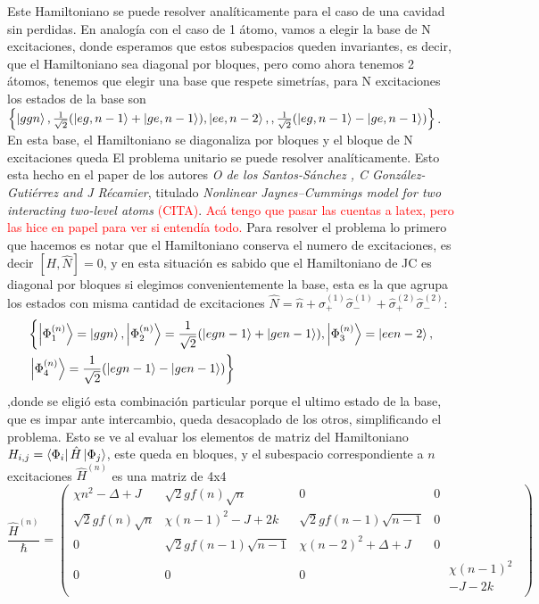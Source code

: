 Este Hamiltoniano se puede resolver analíticamente para el caso de una cavidad sin perdidas. En analogía con el caso de 1 átomo, vamos a elegir la base de N excitaciones, donde esperamos que estos subespacios queden invariantes, es decir, que el Hamiltoniano sea diagonal por bloques, pero como ahora tenemos 2 átomos, tenemos que elegir una base que respete simetrías, para N excitaciones los estados de la base son $\left\{\ket{ggn},\frac{1}{\sqrt{2}}(\ket{eg,n-1}+\ket{ge,n-1}),\ket{ee,n-2},,\frac{1}{\sqrt{2}}(\ket{eg,n-1}-\ket{ge,n-1})\right\}$. En esta base, el Hamiltoniano se diagonaliza por bloques y el bloque de N excitaciones queda
El problema unitario se puede resolver analíticamente. Esto esta hecho en el paper de los autores \textit{O de los Santos-Sánchez
, C González-Gutiérrez and J Récamier}, titulado \textit{Nonlinear Jaynes–Cummings model for two
interacting two-level atoms} \cite{paper:santos}\textcolor{red}{(CITA)}. 
\textcolor{red}{Ac\'a tengo que pasar las cuentas a latex, pero las hice en papel para ver si entend\'ia todo.}
Para resolver el problema lo primero que hacemos es notar que el Hamiltoniano conserva el numero de excitaciones, es decir $[H,\hat N]=0$, y en esta situación es sabido que el Hamiltoniano de JC es diagonal por bloques si elegimos convenientemente la base, esta es la que agrupa los estados con misma cantidad de excitaciones $\hat N = \hat n + \hat \sigma_+^{(1)}\hat \sigma_-^{(1)}+\hat \sigma_+^{(2)}\hat \sigma_-^{(2)}$: 
\begin{equation}
\begin{split}
    & \left\{\ket{\Phi^{(n)}_1}=\ket{ggn},\ket{\Phi^{(n)}_2}=\frac{1}{\sqrt{2}}(\ket{egn-1}+\ket{gen-1}),\ket{\Phi^{(n)}_3}=\ket{een-2},\right. \\
& \left. \ket{\Phi^{(n)}_4}=\frac{1}{\sqrt{2}}(\ket{egn-1}-\ket{gen-1})\right\} 
\end{split}
\label{ec4:base}
\end{equation}
,donde se eligi\'o esta combinaci\'on particular porque el ultimo estado de la base, que es impar ante intercambio, queda desacoplado de los otros, simplificando el problema. Esto se ve al evaluar los elementos de matriz del Hamiltoniano $H_{i,j}=\bra{\Phi_i}\hat H \ket{\Phi_j}$, este queda en bloques, y el subespacio correspondiente a $n$ excitaciones $\hat H^{(n)}$ es una matriz de 4x4
\begin{equation}
    \frac{\hat H^{(n)}}{\hbar}=
    \begin{pmatrix}
     \chi n^2 - \Delta +  J & \sqrt{2} g f(n)\sqrt{n} & 0 & 0 \\
    \sqrt{2} g f(n)\sqrt{n} &  \chi (n-1)^2  -  J + 2 k & \sqrt{2} g f(n-1)\sqrt{n-1} & 0 \\
    0 & \sqrt{2} g f(n-1)\sqrt{n-1} &  \chi (n-2)^2 +  \Delta +  J & 0 \\
    0&0&0& \begin{aligned} 
                 & \chi (n-1)^2  \\ 
                 &-  J - 2 k
        \end{aligned}
    \end{pmatrix}
\end{equation}
